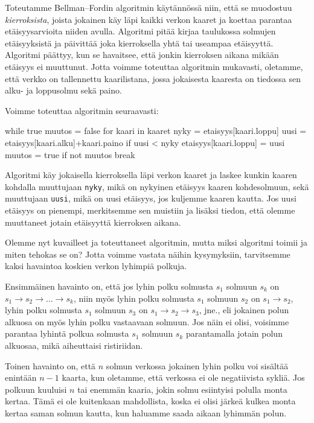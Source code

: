 Toteutamme Bellman–Fordin algoritmin käytännössä niin,
että se muodostuu \emph{kierroksista},
joista jokainen käy läpi kaikki verkon kaaret
ja koettaa parantaa etäisyys\-arvioita niiden avulla.
Algoritmi pitää kirjaa taulukossa solmujen
etäisyyksistä ja päivittää joka kierroksella yhtä
tai useampaa etäisyyttä.
Algoritmi päättyy, kun se havaitsee, että jonkin kierroksen
aikana mikään etäisyys ei muuttunut.
Jotta voimme toteuttaa algoritmin mukavasti,
oletamme, että verkko on tallennettu kaarilistana,
jossa jokaisesta kaaresta on tiedossa sen alku- ja loppusolmu sekä paino.

Voimme toteuttaa algoritmin seuraavasti:

\begin{code}
while true
    muutos = false
    for kaari in kaaret
        nyky = etaisyys[kaari.loppu]
        uusi = etaisyys[kaari.alku]+kaari.paino
        if uusi < nyky
            etaisyys[kaari.loppu] = uusi
            muutos = true
    if not muutos
        break
\end{code}

Algoritmi käy jokaisella kierroksella läpi verkon kaaret
ja laskee kunkin kaaren kohdalla muuttujaan
\texttt{nyky}, mikä on nykyinen etäisyys kaaren
kohdesolmuun, sekä muuttujaan \texttt{uusi}, mikä on uusi etäisyys,
jos kuljemme kaaren kautta.
Jos uusi etäisyys on pienempi, merkitsemme sen muistiin
ja lisäksi tiedon, että olemme muuttaneet jotain
etäisyyttä kierroksen aikana.

Olemme nyt kuvailleet ja toteuttaneet algoritmin,
mutta miksi algoritmi toimii ja miten tehokas se on?
Jotta voimme vastata näihin kysymyksiin,
tarvitsemme kaksi havaintoa koskien verkon lyhimpiä polkuja.

Ensimmäinen havainto on, että jos lyhin polku solmusta $s_1$ solmuun $s_k$ on
$s_1 \rightarrow s_2 \rightarrow \dots \rightarrow s_k$,
niin myös lyhin polku solmusta $s_1$ solmuun $s_2$ on $s_1 \rightarrow s_2$,
lyhin polku solmusta $s_1$ solmuun $s_3$ on $s_1 \rightarrow s_2 \rightarrow s_3$, jne.,
eli jokainen polun alkuosa on myös lyhin polku vastaavaan solmuun.
Jos näin ei olisi, voisimme parantaa lyhintä polkua solmusta $s_1$ solmuun $s_k$
parantamalla jotain polun alkuosaa, mikä aiheuttaisi ristiriidan.

Toinen havainto on,
että $n$ solmun verkossa jokainen lyhin polku voi
sisältää enintään $n-1$ kaarta,
kun oletamme, että verkossa ei ole negatiivista sykliä.
Jos polkuun kuuluisi $n$ tai enemmän kaaria,
jokin solmu esiintyisi polulla monta kertaa.
Tämä ei ole kuitenkaan mahdollista,
koska ei olisi järkeä kulkea monta kertaa saman solmun kautta,
kun haluamme saada aikaan lyhimmän polun.

